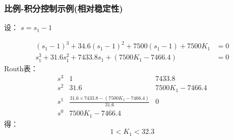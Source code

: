 \documentclass{beamer}
\begin{document}
\begin{frame}
\frametitle{比例-积分控制示例(相对稳定性)}
\label{sec-3-4}

设： $s=s_1-1$

\begin{align*}
(s_1-1)^3+34.6(s_1-1)^2+7500(s_1-1)+7500K_1 &=0 \\
s_1^3 + 31.6 s_1^2+7433.8s_1+(7500K_1-7466.4)&=0
\end{align*}
Routh表：
\[
\begin{matrix}
s^3 & 1    & 7433.8 \\
s^2 & 31.6 & 7500K_1-7466.4 \\
s^1 & \frac{31.6\times 7433.8-(7500K_1-7466.4)}{31.6} & 0 \\
s^0 & 7500K_1-7466.4
\end{matrix}
\]
得： 
\[
1<K_1<32.3
\]
\end{frame}
\end{document}

